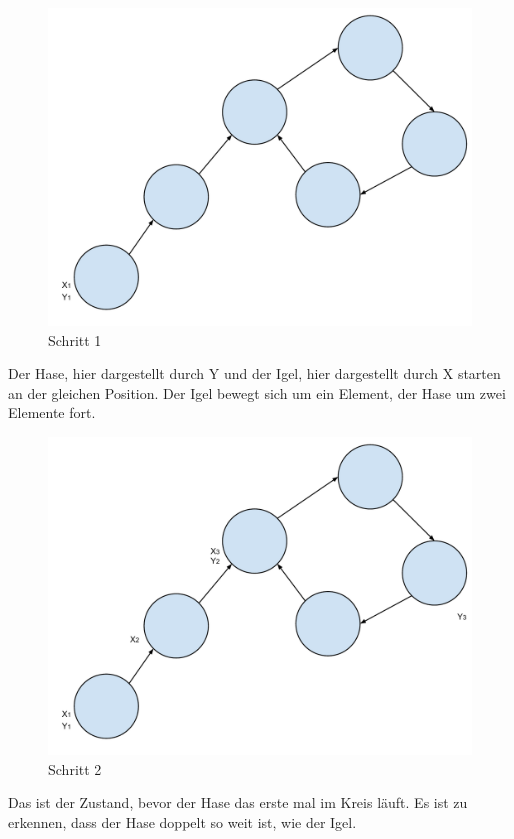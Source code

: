     \begin{figure}[!h] 
    	\centering
    	\includegraphics[width=0.7\linewidth]{Rho1}
    	\caption{Schritt 1}
    	\label{fig:Rho1)}
    \end{figure}
    
    Der Hase, hier dargestellt durch Y und der Igel, hier dargestellt durch X starten an der gleichen Position. Der Igel bewegt sich um ein Element, der Hase um zwei Elemente fort.

  \begin{figure}[!h] 
  	\centering
  	\includegraphics[width=0.7\linewidth]{Rho2}
  	\caption{Schritt 2}
  	\label{fig:Rho2)}
  \end{figure}
  
  Das ist der Zustand, bevor der Hase das erste mal im Kreis l\"auft. Es ist zu erkennen, dass der Hase doppelt so weit ist, wie der Igel.
  
